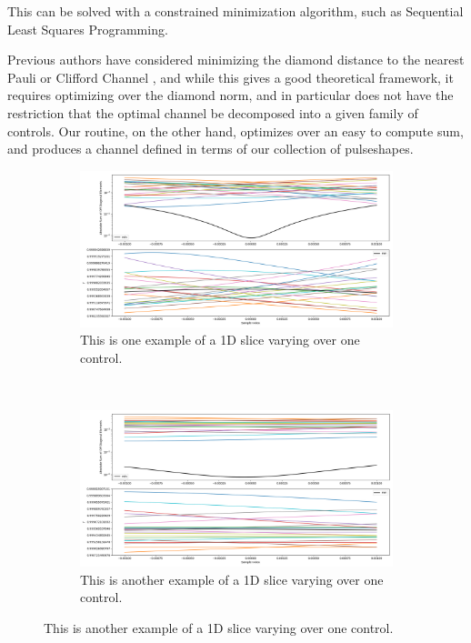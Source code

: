 \documentclass[aps,nofootinbib,pra,notitlepage,twocolumn]{revtex4-1}
\begin{document}
This can be solved with a constrained minimization algorithm, such as Sequential Least Squares Programming\cite{wright1999numerical}.

Previous authors have considered minimizing the diamond distance to the nearest Pauli or Clifford Channel \cite{Magesan2013}, and while this gives a good theoretical framework, it requires optimizing over the diamond norm, and in particular does not have the restriction that the optimal channel be decomposed into a given family of controls. Our routine, on the other hand, optimizes over an easy to compute sum, and produces a channel defined in terms of our collection of pulseshapes.


\begin{figure}
\centering
\begin{subfigure}[t]{.5\linewidth}
\includegraphics[width=\textwidth]{1q0.png}
\caption{This is one example of a 1D slice varying over one control.}
\end{subfigure}%
~
\begin{subfigure}[t]{.5\linewidth}
\includegraphics[width=\textwidth]{1q1.png}
\caption{This is another example of a 1D slice varying over one control.}
\end{subfigure}
  \label{fig:1qnum}
\end{figure}
\end{document}
